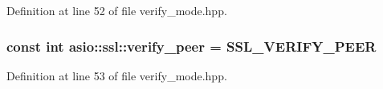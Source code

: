 Definition at line 52 of file verify\+\_\+mode.\+hpp.

\hypertarget{namespaceasio_1_1ssl_ae71141f1eff86b35a2a2491501d55926}{}
\subsubsection[{verify\+\_\+peer}]{\setlength{\rightskip}{0pt plus 5cm}const int asio\+::ssl\+::verify\+\_\+peer = S\+S\+L\+\_\+\+V\+E\+R\+I\+F\+Y\+\_\+\+P\+E\+E\+R}\label{namespaceasio_1_1ssl_ae71141f1eff86b35a2a2491501d55926}


Definition at line 53 of file verify\+\_\+mode.\+hpp.

